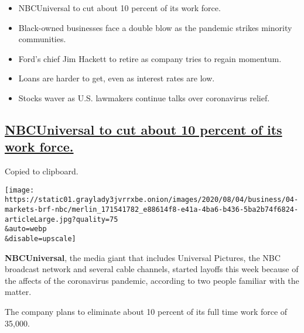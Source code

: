 \begin{itemize}
\item
  \protect\hyperlink{nbcuniversal-to-cut-about-10-percent-of-its-work-force}{}

  NBCUniversal to cut about 10 percent of its work force.
\item
  \protect\hyperlink{black-owned-businesses-face-a-double-blow-as-the-pandemic-strikes-minority-communities}{}

  Black-owned businesses face a double blow as the pandemic strikes
  minority communities.
\item
  \protect\hyperlink{fords-chief-jim-hackett-to-retire-as-company-tries-to-regain-momentum}{}

  Ford's chief Jim Hackett to retire as company tries to regain
  momentum.
\item
  \protect\hyperlink{loans-are-harder-to-get-even-as-interest-rates-are-low}{}

  Loans are harder to get, even as interest rates are low.
\item
  \protect\hyperlink{stocks-waver-as-us-lawmakers-continue-talks-over-coronavirus-relief}{}

  Stocks waver as U.S. lawmakers continue talks over coronavirus relief.
\end{itemize}

\hypertarget{nbcuniversal-to-cut-about-10-percent-of-its-work-force}{%
\subsection{\texorpdfstring{\protect\hyperlink{nbcuniversal-to-cut-about-10-percent-of-its-work-force}{NBCUniversal
to cut about 10 percent of its work
force.}}{NBCUniversal to cut about 10 percent of its work force.}}\label{nbcuniversal-to-cut-about-10-percent-of-its-work-force}}

Copied to clipboard.

\texttt{[image: https://static01.graylady3jvrrxbe.onion/images/2020/08/04/business/04-markets-brf-nbc/merlin\_171541782\_e88614f8-e41a-4ba6-b436-5ba2b74f6824-articleLarge.jpg?quality=75\\\&auto=webp\\\&disable=upscale]}

\textbf{NBCUniversal}, the media giant that includes Universal Pictures,
the NBC broadcast network and several cable channels, started layoffs
this week because of the affects of the coronavirus pandemic, according
to two people familiar with the matter.

The company plans to eliminate about 10 percent of its full time work
force of 35,000.

